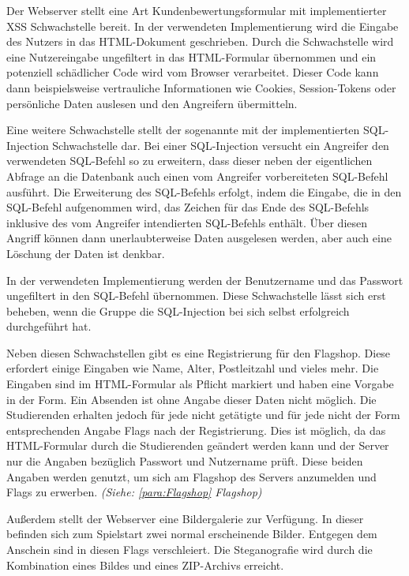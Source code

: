 Der Webserver stellt eine Art Kundenbewertungsformular mit implementierter XSS Schwachstelle bereit. In der verwendeten Implementierung wird die Eingabe des Nutzers in das HTML-Dokument geschrieben. Durch die Schwachstelle wird eine Nutzereingabe ungefiltert in das HTML-Formular übernommen und ein potenziell schädlicher Code wird vom Browser verarbeitet. Dieser Code kann dann beispielsweise vertrauliche Informationen wie Cookies, Session-Tokens oder persönliche Daten auslesen und den Angreifern übermitteln. \cite{ruettenSicherheitWebanwendungen2007}

Eine weitere Schwachstelle stellt der sogenannte  mit der implementierten SQL-Injection Schwachstelle dar. 
Bei einer SQL-Injection versucht ein Angreifer den verwendeten SQL-Befehl so zu erweitern, dass dieser neben der eigentlichen Abfrage an die Datenbank auch einen vom Angreifer vorbereiteten SQL-Befehl ausführt. Die Erweiterung des SQL-Befehls erfolgt, indem die Eingabe, die in den SQL-Befehl aufgenommen wird, das Zeichen für das Ende des SQL-Befehls inklusive des vom Angreifer intendierten SQL-Befehls enthält. Über diesen Angriff können dann unerlaubterweise Daten ausgelesen werden, aber auch eine Löschung der Daten ist denkbar. \cite{bachfeldGiftspritze2004}

In der verwendeten Implementierung werden der Benutzername und das Passwort ungefiltert in den SQL-Befehl übernommen. Diese Schwachstelle lässt sich erst beheben, wenn die Gruppe die SQL-Injection bei sich selbst erfolgreich durchgeführt hat. \cite[S.27-29]{abtsUeberarbeitungUndErweiterung2016}

Neben diesen Schwachstellen gibt es eine Registrierung für den Flagshop. Diese erfordert einige Eingaben wie Name, Alter, Postleitzahl und vieles mehr. Die Eingaben sind im HTML-Formular als Pflicht markiert und haben eine Vorgabe in der Form. Ein Absenden ist ohne Angabe dieser Daten nicht möglich. Die Studierenden erhalten jedoch für jede nicht getätigte und für jede nicht der Form entsprechenden Angabe Flags nach der Registrierung. \cite[S.26]{abtsUeberarbeitungUndErweiterung2016} Dies ist möglich, da das HTML-Formular durch die Studierenden geändert werden kann und der Server nur die Angaben bezüglich Passwort und Nutzername prüft. Diese beiden Angaben werden genutzt, um sich am Flagshop des Servers anzumelden und Flags zu erwerben. \textit{(Siehe: \autoref{para:Flagshop} Flagshop)}

Außerdem stellt der Webserver eine Bildergalerie zur Verfügung. In dieser befinden sich zum Spielstart zwei normal erscheinende Bilder. Entgegen dem Anschein sind in diesen Flags verschleiert. Die Steganografie wird durch die Kombination eines Bildes und eines ZIP-Archivs erreicht. \cite[S.27]{abtsUeberarbeitungUndErweiterung2016}